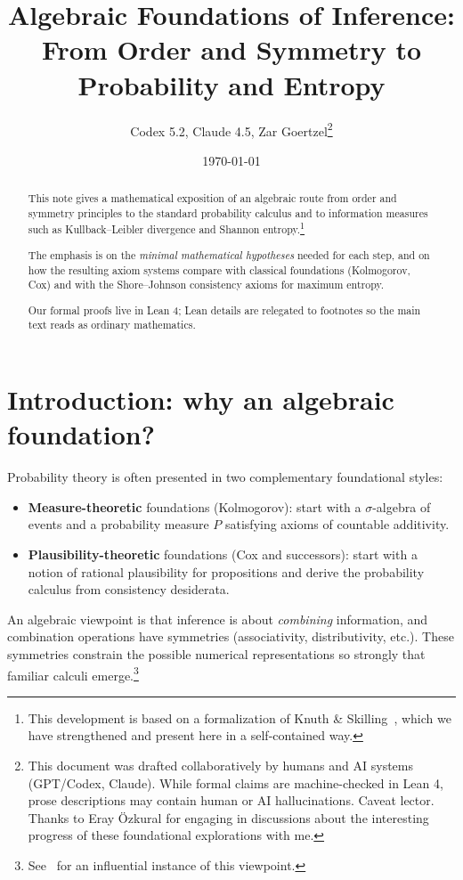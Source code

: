 \documentclass[11pt]{article}
\title{Algebraic Foundations of Inference:\\From Order and Symmetry to Probability and Entropy}
\author{Codex 5.2, Claude 4.5, Zar Goertzel\thanks{This document was drafted collaboratively by humans and AI systems (GPT/Codex, Claude). While formal claims are machine-checked in Lean 4, prose descriptions may contain human or AI hallucinations. Caveat lector. Thanks to Eray \"Ozkural for engaging in discussions about the interesting progress of these foundational explorations with me.}}
\date{\today}
\theoremstyle{definition}
\theoremstyle{remark}
\begin{document}
\maketitle

\begin{abstract}
This note gives a mathematical exposition of an algebraic route from order and symmetry principles to the
standard probability calculus and to information measures such as Kullback--Leibler divergence and Shannon
entropy.\footnote{This development is based on a formalization of Knuth \& Skilling~\cite{KnuthSkilling2012}, which we have strengthened and present here in a self-contained way.}

The emphasis is on the \emph{minimal mathematical hypotheses} needed for each step, and on how the resulting
axiom systems compare with classical foundations (Kolmogorov, Cox) and with the Shore--Johnson consistency
axioms for maximum entropy.

Our formal proofs live in Lean 4; Lean details are relegated to footnotes so the main text reads as
ordinary mathematics.
\end{abstract}

\tableofcontents

\section{Introduction: why an algebraic foundation?}

Probability theory is often presented in two complementary foundational styles:

\begin{itemize}
\item \textbf{Measure-theoretic} foundations (Kolmogorov): start with a $\sigma$-algebra of events and a
  probability measure $P$ satisfying axioms of countable additivity.
\item \textbf{Plausibility-theoretic} foundations (Cox and successors): start with a notion of rational
  plausibility for propositions and derive the probability calculus from consistency desiderata.
\end{itemize}

An algebraic viewpoint is that inference is about \emph{combining} information, and combination operations
have symmetries (associativity, distributivity, etc.). These symmetries constrain the possible numerical
representations so strongly that familiar calculi emerge.\footnote{See~\cite{KnuthSkilling2012} for an influential
instance of this viewpoint.}
\end{document}

